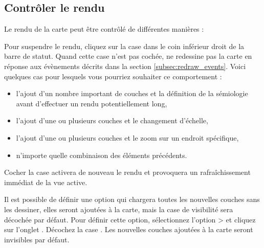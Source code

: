 \subsection{Contrôler le rendu} \label{label_controlmap}

Le rendu de la carte peut être contrôlé de différentes manières :

 
\label{label_suspendrender}

Pour suspendre le rendu, cliquez sur la case dans le coin inférieur droit de la barre de statut. Quand cette case n'est pas cochée, \qg ne redessine pas la carte en réponse aux évènements décrits dans la section \ref{subsec:redraw_events}. Voici quelques cas pour lesquels vous pourriez souhaiter ce comportement :

\begin{itemize}[label=--]
\item l'ajout d'un nombre important de couches et la définition de la sémiologie avant d'effectuer un rendu potentiellement long,
\item l'ajout d'une ou plusieurs couches et le changement d'échelle,
\item l'ajout d'une ou plusieurs couches et le zoom sur un endroit spécifique,
\item n'importe quelle combinaison des éléments précédents.
\end{itemize}

Cocher la case  activera de nouveau le rendu et provoquera un rafraîchissement immédiat de la vue active.

 \label{label_settinglayer}
 

Il est possible de définir une option qui chargera toutes les nouvelles couches sans les dessiner, elles seront ajoutées à la carte, mais la case de visibilité sera décochée par défaut. Pour définir cette option, sélectionnez l'option  >  et cliquez sur l'onglet . Décochez la case . Les nouvelles couches ajoutées à la carte seront invisibles par défaut.

%
%
%
\label{label_updatemap} 

